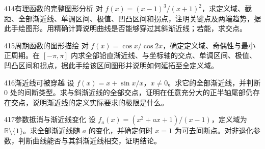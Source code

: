 \begin{exercise}{414}{有理函数的完整图形分析}
对 $f(x)=(x-1)^3/(x+1)^2$，求定义域、截距、全部渐近线、单调区间、极值、凹凸区间和拐点，注明关键点及两端趋势，据此手绘图形。用精确计算说明曲线是否能够穿过其斜渐近线；若能，求交点。
\end{exercise}
\begin{exercise}{415}{周期函数的图形描绘}
对 $f(x)=\cos x/\cos2x$，确定定义域、奇偶性与最小正周期。在 $[-\pi,\pi]$ 内求全部铅直渐近线、与坐标轴的交点、单调区间、极值、凹凸区间和拐点，据此手绘该区间图形并说明如何延拓至全定义域。
\end{exercise}
\begin{exercise}{416}{渐近线可被穿越}
设 $f(x)=x+\sin x/x$，$x\ne0$。求它的全部渐近线，并判断 $0$ 处的间断类型。求与斜渐近线的全部交点，证明在任意充分大的正半轴尾部仍存在交点，说明渐近线的定义实际要求的极限是什么。
\end{exercise}
\begin{exercise}{417}{参数抵消与渐近线变化}
设 $f_a(x)=(x^2+ax+1)/(x-1)$，定义域为 $\mathbb R\setminus\{1\}$。求全部渐近线随 $a$ 的变化，并确定何时 $x=1$ 为可去间断点。对非退化参数，判断曲线能否与其斜渐近线相交，证明结论。
\end{exercise}
